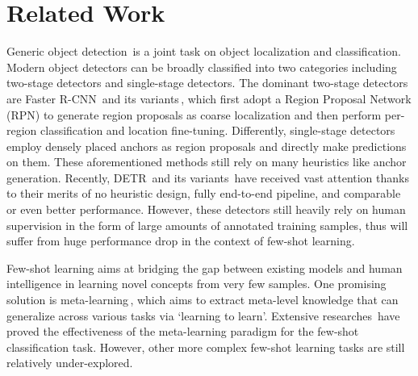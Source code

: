 \documentclass[10pt,twocolumn,letterpaper]{article}
\begin{document}
\section{Related Work}
\smallskip
{}
Generic object detection\,\cite{Liu2019DeepLF} is a joint task on object localization and classification. Modern object detectors can be broadly classified into two categories including two-stage detectors and single-stage detectors. The dominant two-stage detectors are Faster R-CNN\,\cite{FasterRCNN} and its variants\,\cite{IoUNet,CascadeRCNN,masktextspotter,SNIP,SNIPER,ROITransformer,CADNet,klloss,CircularSmoothLabel,rahman2018zeroshot}, which first adopt a Region Proposal Network (RPN) to generate region proposals as coarse localization and then perform per-region classification and location fine-tuning. Differently, single-stage detectors\;\cite{SSD,YOLO9000,RON,focalloss,ScaleTransferrableOD,LearningRF,RefineDet,RFBNet} employ densely placed anchors as region proposals and directly make predictions on them. 
These aforementioned methods still rely on many heuristics like anchor generation.
Recently, DETR\,\cite{DETR} and its variants\,\cite{DeformableDETR,up-detr,TSP,DETR_Pedestrian,ACT} have received vast attention thanks to their merits of no heuristic design, fully end-to-end pipeline, and comparable or even better performance.
However, these detectors still heavily rely on human supervision in the form of large amounts of annotated training samples, thus will suffer from huge performance drop in the context of few-shot learning.

\medskip
{}
Few-shot learning aims at bridging the gap between existing models and human intelligence in learning novel concepts from very few samples. One promising solution is meta-learning\,\cite{metalearning_survey1,metalearning_survey2}, which aims to extract meta-level knowledge that can generalize across various tasks via `learning to learn'. Extensive researches\,\cite{MAML,MatchNet,ProtoNet,RelationNetwork,DynamicFewshotWOForgetting,SNAIL,CloserFewshotClassification,FSLGlobalClassRep,MetaOptNet,MTL,tafe,RepMet,Ravichandran2019FewShotLW,PARN,tewam,Dvornik_2019_ICCV,ye2020fewshot,NewMetaBaseline,FewShotAdaMarginLoss,FSOpenSet,IFSMLIDA} have proved the effectiveness of the meta-learning paradigm for the few-shot classification task. However, other more complex few-shot learning tasks\;\cite{MetaView,Gui2018FewShotHM,Nguyen_2019_ICCV,Wertheimer_2019_CVPR,Wang_2020_CVPR,FSAdaptiveFRCNN} are still relatively under-explored.
\end{document}
